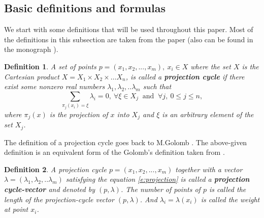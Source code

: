 \documentclass[12p]{article}
\numberwithin{equation}{section}
\newtheorem{definition}{Definition}[section]
\begin{document}
\subsection{Basic definitions and formulas}
\bigskip
We start with some definitions that will be used throughout this paper. Most of the definitions in this subsection are taken from the paper \cite{Ismailov_2009} (also can be found in the monograph \cite{Ismailov_2021}).
\begin{definition}
    A set of points \(p=(x_1,x_2,...,x_m), \ x_i \in X\) where the set \(X\) is the Cartesian product \(X=X_1\times X_2 \times\dots X_n\), is called a \textbf{projection cycle} if there exist some nonzero real numbers \(\lambda_1,\lambda_2,..\lambda_m\) such that
    \begin{equation}\label{e:projection}
        \sum_{\pi_j(x_i)=\xi}\lambda_i=0, \ \forall  \xi \in X_j \ \text{ and } \ \forall j, \  0\le j\le n,
    \end{equation}
    where \(\pi_j(x)\) is the projection of \(x\) into \(X_j\) and \(\xi\) is an arbitrary element of the set \(X_j\). 
\end{definition}
The definition of a projection cycle goes back to M.Golomb \cite{Golomb}. The above-given definition is an equivalent form of the Golomb's definition taken from \cite{Ismailov_2009}. 
\begin{definition}
    A projection cycle \(p=(x_1,x_2,...,x_m)\) together with a vector \(\lambda=(\lambda_1,\lambda_2,..\lambda_m)\) satisfying the equation \eqref{e:projection} is called a \textbf{projection cycle-vector} and denoted by \((p,\lambda)\). The number of points of \(p\) is called the length of the projection-cycle vector \((p,\lambda)\). And \(\lambda_i=\lambda(x_i)\) is called the weight at point \(x_i\).
\end{definition}
\end{document}

